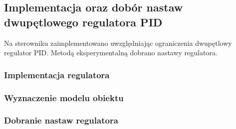 \subsection{Implementacja oraz dobór nastaw dwupętlowego regulatora PID}
\label{lab:zad3}


\ifdefined\CompileFigures
%    
\fi

Na	sterowniku	zaimplementowano	uwzględniając	ograniczenia	dwupętlowy	
regulator	PID. Metodą	eksperymentalną	 dobrano	nastawy	regulatora.

\subsubsection{Implementacja regulatora}


\subsubsection{Wyznaczenie modelu obiektu}


\subsubsection{Dobranie nastaw regulatora}




\newpage
